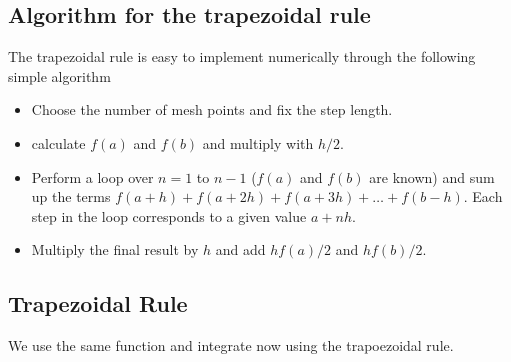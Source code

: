 \documentclass[letterpaper,10pt,english]{sphinxmanual}
\begin{document}
\subsection{Algorithm for the trapezoidal rule}
\label{\detokenize{chapter3:algorithm-for-the-trapezoidal-rule}}
The trapezoidal rule is easy to  implement numerically
through the following simple algorithm
\begin{itemize}
\item {} 
Choose the number of mesh points and fix the step length.

\item {} 
calculate \(f(a)\) and \(f(b)\) and multiply with \(h/2\).

\item {} 
Perform a loop over \(n=1\) to \(n-1\) (\(f(a)\) and \(f(b)\) are known) and sum up  the terms \(f(a+h) +f(a+2h)+f(a+3h)+\dots +f(b-h)\). Each step in the loop  corresponds to a given value \(a+nh\).

\item {} 
Multiply the final result by \(h\) and add \(hf(a)/2\) and \(hf(b)/2\).

\end{itemize}


\subsection{Trapezoidal Rule}
\label{\detokenize{chapter3:trapezoidal-rule}}
We use the same function and integrate now using the trapoezoidal rule.
\end{document}
